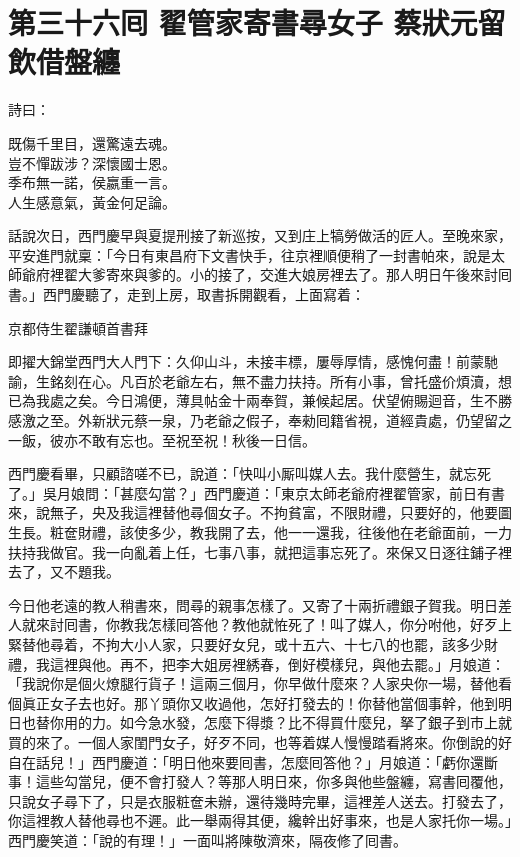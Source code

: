 
\chapter*{第三十六囘 翟管家寄書尋女子 蔡狀元留飲借盤纏}


詩曰：

\begin{myquote} 
既傷千里目，還驚遠去魂。\\豈不憚跋涉？深懷國士恩。\\季布無一諾，侯嬴重一言。\\人生感意氣，黃金何足論。
\end{myquote} 

話說次日，西門慶早與夏提刑接了新巡按，又到庄上犒勞做活的匠人。至晚來家，平安進門就稟：「今日有東昌府下文書快手，往京裡順便稍了一封書帕來，說是太師爺府裡翟大爹寄來與爹的。小的接了，交進大娘房裡去了。那人明日午後來討囘書。」西門慶聽了，走到上房，取書拆開觀看，上面寫着：

\begin{myquote}[\markfont]
京都侍生翟謙頓首書拜

即擢大錦堂西門大人門下：久仰山斗，未接丰標，屢辱厚情，感愧何盡！前蒙馳諭，生銘刻在心。凡百於老爺左右，無不盡力扶持。所有小事，曾托盛价煩瀆，想已為我處之矣。今日鴻便，薄具帖金十兩奉賀，兼候起居。伏望俯賜迴音，生不勝感激之至。外新狀元蔡一泉，乃老爺之假子，奉勑囘籍省視，道經貴處，仍望留之一飯，彼亦不敢有忘也。至祝至祝！秋後一日信。
\end{myquote} 

西門慶看畢，只顧諮嗟不已，說道：「快叫小厮叫媒人去。我什麼營生，就忘死了。」{}吳月娘問：「甚麼勾當？」西門慶道：「東京太師老爺府裡翟管家，前日有書來，說無子，央及我這裡替他尋個女子。不拘貧富，不限財禮，只要好的，他要圖生長。粧奩財禮，該使多少，教我開了去，他一一還我，往後他在老爺面前，一力扶持我做官。我一向亂着上任，七事八事，就把這事忘死了。來保又日逐往鋪子裡去了，又不題我。

今日他老遠的教人稍書來，問尋的親事怎樣了。又寄了十兩折禮銀子賀我。明日差人就來討囘書，你教我怎樣囘答他？教他就恠死了！叫了媒人，你分咐他，好歹上緊替他尋着，不拘大小人家，只要好女兒，或十五六、十七八的也罷，該多少財禮，我這裡與他。再不，把李大姐房裡綉春，倒好模樣兒，與他去罷。」月娘道：「我說你是個火燎腿行貨子！這兩三個月，你早做什麼來？人家央你一場，替他看個眞正女子去也好。那丫頭你又收過他，怎好打發去的！你替他當個事幹，他到明日也替你用的力。如今急水發，怎麼下得漿？比不得買什麼兒，拏了銀子到市上就買的來了。一個人家閨門女子，好歹不同，也等着媒人慢慢踏看將來。你倒說的好自在話兒！」西門慶道：「明日他來要囘書，怎麼囘答他？」月娘道：「虧你還斷事！這些勾當兒，便不會打發人？等那人明日來，你多與他些盤纏，寫書囘覆他，只說女子尋下了，只是衣服粧奩未辦，還待幾時完畢，這裡差人送去。打發去了，你這裡教人替他尋也不遲。此一舉兩得其便，纔幹出好事來，也是人家托你一場。」西門慶笑道：「說的有理！」一面叫將陳敬濟來，隔夜修了囘書。

